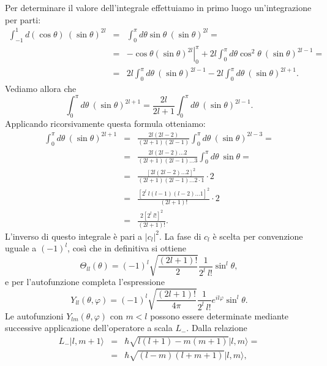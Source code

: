 Per determinare il valore dell'integrale effettuiamo in primo luogo un'integrazione per parti:
\begin{eqnarray}
\int _{-1} ^1 d(\cos \theta )\ (\sin \theta ) ^{2l} &=& \int _{0} ^{\pi} d\theta \sin \theta\ (\sin \theta ) ^{2l} = \nonumber \\
&=& \left. -\cos \theta (\sin \theta ) ^{2l} \right\vert _0 ^{\pi} +2l\int _{0} ^{\pi} d\theta \cos ^2 \theta \ (\sin \theta ) ^{2l-1} = \nonumber \\
&=&  2l\int _{0} ^{\pi} d\theta \ (\sin \theta ) ^{2l-1} - 2l\int _{0} ^{\pi} d\theta  \ (\sin \theta ) ^{2l+1} .
\end{eqnarray}
Vediamo allora che 
\begin{equation}
\int _{0} ^{\pi} d\theta \ (\sin \theta ) ^{2l+1}=\frac{2l}{2l+1} \int _{0} ^{\pi} d\theta \ (\sin \theta ) ^{2l-1}.
\end{equation}
Applicando ricorsivamente questa formula otteniamo:
\begin{eqnarray}
\int _{0} ^{\pi} d\theta \ (\sin \theta ) ^{2l+1} & = & \frac{2l(2l-2)}{(2l+1)(2l-1)} \int _{0} ^{\pi} d\theta \ (\sin \theta ) ^{2l-3} = \nonumber \\
&=& \frac{2l(2l-2)\dots 2}{(2l+1)(2l-1)\dots 3} \int _{0} ^{\pi} d\theta \ \sin \theta =\nonumber \\
&=& \frac{[2l(2l-2)\dots 2]^2}{(2l+1)(2l-1)\dots 2\cdot 1}\cdot 2 \nonumber \\
& = &  \frac{[2^l\ l(l-1)(l-2)\dots 1]^2}{(2l+1)!}\cdot 2 \nonumber \\
&=& \frac{2[2^l\ l!]^2}{(2l+1)!}.
\end{eqnarray}
L'inverso di questo integrale è pari a $\vert c_l \vert ^2$. La fase di $c_l$ è scelta per convenzione uguale a $(-1)^l$, così che in definitiva si ottiene
\begin{equation}
\Theta _{ll} (\theta ) = (-1)^l \sqrt{\frac{(2l+1)!}{2}}\frac{1}{2^l\ l!}\sin^l \theta ,
\end{equation}
e per l'autofunzione completa l'espressione
\begin{equation}
Y_{ll} (\theta , \varphi) = (-1)^l \sqrt{\frac{(2l+1)!}{4\pi}}\frac{1}{2^l\ l!}e^{il\varphi} \sin ^l \theta  .
\end{equation}
Le autofunzioni $Y_{lm}(\theta , \varphi)$ con $m<l$ possono essere determinate mediante successive applicazione dell'operatore a scala $L_-$. Dalla relazione
\begin{eqnarray}
L_-\vert l, m+1 \rangle &=& \hbar \sqrt{l(l+1) - m(m+1)} \vert l,m \rangle = \nonumber \\
&=& \hbar \sqrt{(l-m)(l+m+1)} \vert l,m \rangle ,
\end{eqnarray}
